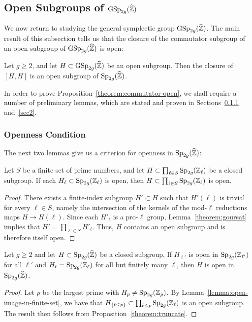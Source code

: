 	
	\subsection{Open Subgroups of $\operatorname{GSp}_{2g}(\widehat{\mathbb Z})$}
	\label{subsection:open-subgroups}
We now return to studying the general symplectic group $\operatorname{GSp}_{2g}(\widehat{\mathbb Z})$. The main result of this subsection tells us that the closure of the commutator subgroup of an open subgroup of $\operatorname{GSp}_{2g}(\widehat{\mathbb Z})$ is open:


\begin{proposition} \label{theorem:commutator-open}
Let $g \geq 2$, and let $H \subset \operatorname{GSp}_{2g}(\widehat{{\mathbb Z}})$ be an open subgroup. Then the closure of $[H, H]$ is an open subgroup of $\operatorname{Sp}_{2g}(\widehat{{\mathbb Z}})$.
\end{proposition}

In order to prove Proposition~\ref{theorem:commutator-open}, we shall require a number of preliminary lemmas, which are stated and proven in Sections~\ref{sec1} and~\ref{sec2}.

\subsubsection{Openness Condition}\label{sec1}

The next two lemmas give us a criterion for openness in $\operatorname{Sp}_{2g}(\widehat{{\mathbb Z}})$:

\begin{lemma}
		\label{lemma:open-image-in-finite-set}
		Let $S$ be a finite set of prime numbers, and let $H \subset \prod_{\ell \in S} \operatorname{Sp}_{2g}({\mathbb Z}_\ell)$ be a closed subgroup. If each $H_\ell \subset \operatorname{Sp}_{2g}({\mathbb Z}_\ell)$ is open, then $H \subset \prod_{\ell \in S} \operatorname{Sp}_{2g}({\mathbb Z}_\ell)$ is open.
	\end{lemma}
	\begin{proof}
		There exists a finite-index subgroup $H' \subset H$ such that $H'(\ell)$ is trivial for every $\ell \in S$, namely the intersection of the kernels of the mod-$\ell$ reductions maps $H \to H(\ell)$. Since each $H'_\ell$ is a pro-$\ell$ group, Lemma~\ref{theorem:goursat} implies that $H' = \prod_{\ell \in S} H'_\ell$.
		Thus, $H$ contains an open subgroup and is therefore itself open.
	\end{proof}

       \begin{lemma}
		\label{theorem:adelic-open}
		Let $g \geq 2$ and let $H \subset \operatorname{Sp}_{2g}(\widehat{{\mathbb Z}})$ be a closed subgroup. If $H_{\ell'}$ is open in $\operatorname{Sp}_{2g}({\mathbb Z}_{\ell'})$ for all $\ell'$ and $H_\ell = \operatorname{Sp}_{2g}({\mathbb Z}_\ell)$ for all but finitely many $\ell$, then $H$ is open in $\operatorname{Sp}_{2g}(\widehat{{\mathbb Z}})$.
	\end{lemma}
	\begin{proof}
		Let $p$ be the largest prime with $H_{p} \neq \operatorname{Sp}_{2g}(\mathbb Z_{p})$. By Lemma~\ref{lemma:open-image-in-finite-set}, we have that  $H_{\{\ell \le p\}} \subset \prod_{\ell \le p} \operatorname{Sp}_{2g}(\mathbb Z_\ell)$ is an open subgroup.
		The result then follows from Proposition~\ref{theorem:truncate}.
	\end{proof}

